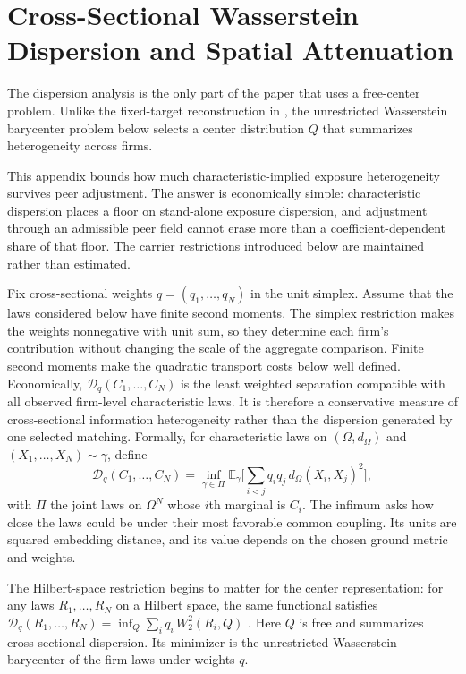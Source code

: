 \section{Cross-Sectional Wasserstein Dispersion and Spatial Attenuation}
\label{sec:dispersion}

The dispersion analysis is the only part of the paper that uses a free-center
problem.
Unlike the fixed-target reconstruction in , the
unrestricted Wasserstein barycenter problem below selects a center distribution
$Q$ that summarizes heterogeneity across firms.

This appendix bounds how much characteristic-implied exposure heterogeneity
survives peer adjustment.
The answer is economically simple: characteristic
dispersion places a floor on stand-alone exposure dispersion, and
adjustment through an admissible peer field cannot erase more than a
coefficient-dependent share of that floor.
The carrier restrictions introduced below are maintained rather than
estimated.

Fix cross-sectional weights $q=(q_1,\ldots,q_N)$ in the unit simplex.
Assume that the laws considered below have finite second moments.
The simplex restriction makes the weights nonnegative with unit sum,
so they determine each firm's contribution without changing the scale
of the aggregate comparison.
Finite second moments make the quadratic transport costs below well defined.
Economically, $\mathcal D_q(C_1,\dots,C_N)$ is the least weighted
separation compatible with all observed firm-level characteristic laws.
It is therefore a conservative measure of cross-sectional information
heterogeneity rather than the dispersion generated by one selected matching.
Formally, for characteristic laws on $(\Omega,d_\Omega)$ and
$(X_1,\dots,X_N)\sim\gamma$, define
\[
  \mathcal D_q(C_1,\dots,C_N)
  =\inf_{\gamma\in\Pi}
  \mathbb E_\gamma\Big[\sum_{i<j}q_{i}q_{j}\,d_\Omega(X_i,X_j)^2\Big],
\]
with $\Pi$ the joint laws on $\Omega^N$ whose $i$th marginal is $C_i$.
The infimum asks how close the laws could be under their most
favorable common coupling.
Its units are squared embedding distance, and its value depends on
the chosen ground metric and weights.

The Hilbert-space restriction begins to matter for the center
representation: for any laws $R_1,\ldots,R_N$ on a Hilbert space, the
same functional satisfies
$\mathcal D_q(R_1,\ldots,R_N)=\inf_Q\sum_i q_i\,W_2^2(R_i,Q)$
\citep{agueh_carlier_barycenters_2011,gawronsky_distance_mpt_2026}.
Here $Q$ is free and summarizes cross-sectional dispersion.
Its minimizer is the unrestricted Wasserstein barycenter of the firm laws under
weights $q$.

